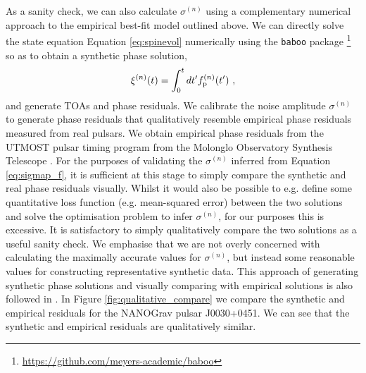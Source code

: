\documentclass[fleqn,usenatbib,useAMS]{mnras}
\begin{document}
As a sanity check, we can also calculate $\sigma^{(n)}$ using a complementary numerical approach to the empirical best-fit model outlined above. We can directly solve the state equation Equation \eqref{eq:spinevol} numerically using the \texttt{baboo} package \footnote{\url{https://github.com/meyers-academic/baboo}} so as to obtain a synthetic phase solution,
\begin{eqnarray}
	\xi^{(n)}(t) = \int_0^t dt' f^{(n)}_{\rm p}(t') \ ,
\end{eqnarray}
and generate TOAs and phase residuals. We calibrate the noise amplitude $\sigma^{(n)}$  to generate phase residuals that qualitatively resemble empirical phase residuals measured from real pulsars. We obtain empirical phase residuals from the UTMOST pulsar timing program \citep{UTMOST} from the  Molonglo Observatory Synthesis Telescope \citep{Bailes2017PASA...34...45B}. For the purposes of validating the $\sigma^{(n)}$ inferred from Equation \eqref{eq:sigmap_f}, it is sufficient at this stage to simply compare the synthetic and real phase residuals visually. Whilst it would also be possible to e.g. define some quantitative loss function (e.g. mean-squared error) between the two solutions and solve the optimisation problem to infer $\sigma^{(n)}$, for our purposes this is excessive. It is satisfactory to simply qualitatively compare the two solutions as a useful sanity check. We emphasise that we are not overly concerned with calculating the maximally accurate values for $\sigma^{(n)}$, but instead some reasonable values for constructing representative synthetic data. This approach of generating synthetic phase solutions and visually comparing with empirical solutions is also followed in \cite{Vargas}. In Figure \ref{fig:qualitative_compare} we compare the synthetic and empirical residuals for the NANOGrav pulsar J0030+0451. We can see that the synthetic and empirical residuals are qualitatively similar.
\end{document}
